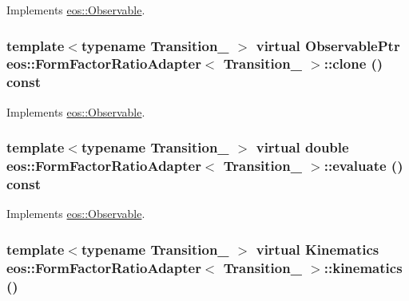 Implements \hyperlink{classeos_1_1Observable_a20e8218d04aa5589ce795ddd425751a0}{eos::Observable}.\hypertarget{classeos_1_1FormFactorRatioAdapter_ab5c4a8094db5ac8fc3860afc4a4087b0}{
\subsubsection[{clone}]{\setlength{\rightskip}{0pt plus 5cm}template$<$typename Transition\_\- $>$ virtual {\bf ObservablePtr} {\bf eos::FormFactorRatioAdapter}$<$ Transition\_\- $>$::clone () const}}
\label{classeos_1_1FormFactorRatioAdapter_ab5c4a8094db5ac8fc3860afc4a4087b0}


Implements \hyperlink{classeos_1_1Observable_a1c88c66a224a14fbddad70e95cb61136}{eos::Observable}.\hypertarget{classeos_1_1FormFactorRatioAdapter_af0bed5942d9ba4b3c65788e1e05eaf8c}{
\subsubsection[{evaluate}]{\setlength{\rightskip}{0pt plus 5cm}template$<$typename Transition\_\- $>$ virtual double {\bf eos::FormFactorRatioAdapter}$<$ Transition\_\- $>$::evaluate () const}}
\label{classeos_1_1FormFactorRatioAdapter_af0bed5942d9ba4b3c65788e1e05eaf8c}


Implements \hyperlink{classeos_1_1Observable_a913385d3a077d578bbcc2d502e5fdc2d}{eos::Observable}.\hypertarget{classeos_1_1FormFactorRatioAdapter_a821bf6d21630dd75c8a25cd18f1cdd59}{
\subsubsection[{kinematics}]{\setlength{\rightskip}{0pt plus 5cm}template$<$typename Transition\_\- $>$ virtual {\bf Kinematics} {\bf eos::FormFactorRatioAdapter}$<$ Transition\_\- $>$::kinematics ()}}
\label{classeos_1_1FormFactorRatioAdapter_a821bf6d21630dd75c8a25cd18f1cdd59}


